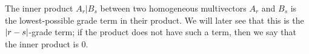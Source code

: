 \begin{definition}\label{d:inner-product1}
	The inner product $A_r|B_s$ between two homogeneous multivectors $A_r$ and $B_s$ is the lowest-possible grade term in their product. We will later see that this is the $\left|r-s\right|$-grade term; if the product does not have such a term, then we say that the inner product is 0.
\end{definition}
